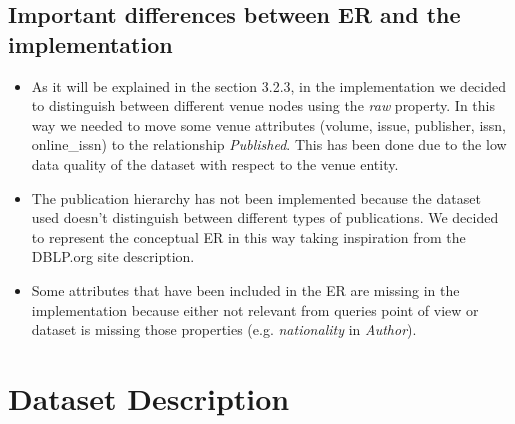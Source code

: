 \documentclass{Configuration_Files/PoliMi3i_thesis}
\begin{document}
\section{Important differences between ER and the implementation}
\begin{itemize}
    \item As it will be explained in the section 3.2.3, in the implementation we decided to distinguish between different venue
            nodes using the \emph{raw} property. In this way we needed to move some venue attributes (volume, issue, publisher, issn, online_issn)
            to the relationship \emph{Published}. This has been done due to the low data quality of the dataset with respect to the venue entity.
    \item The publication hierarchy has not been implemented because the dataset used doesn't distinguish between different types of
            publications. We decided to represent the conceptual ER in this way taking inspiration from the DBLP.org site description.
    \item Some attributes that have been included in the ER are missing in the implementation because either not relevant from queries
            point of view or dataset is missing those properties (e.g. \emph{nationality} in \emph{Author}).
\end{itemize}

\chapter{Dataset Description}
\end{document}
